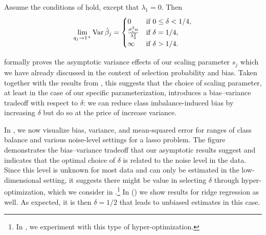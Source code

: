 \begin{corollary}
  \label{cor:ridge-variance}
  Assume the conditions of  hold, except that \(\lambda_1 = 0\). Then
  \[
    \lim_{q_j \rightarrow 1^+} \operatorname{Var} \hat{\beta}_j =
    \begin{cases}
      0                                          & \text{if } 0 \leq \delta < 1/4, \\
      \frac{\sigma_\varepsilon^2 n}{\lambda_2^2} & \text{if } \delta = 1/4,        \\
      \infty                                     & \text{if } \delta > 1/4.
    \end{cases}
  \]
\end{corollary}

 formally proves the asymptotic variance effects of our
scaling parameter \(s_j\) which we have already discussed in the context of selection
probability and bias. Taken together with the results from ,
this suggests that the choice of scaling parameter, at least in the case of our specific
parameterization, introduces a bias--variance tradeoff with respect to \(\delta\): we can
reduce class imbalance-induced bias by increasing \(\delta\) but do so at the price of
increase variance.

In , we now visualize bias, variance, and mean-squared
error for ranges of class balance and various noise-level settings for a lasso problem. The
figure demonstrates the bias--variance tradeoff that our asymptotic results suggest and
indicates that the optimal choice of \(\delta\) is related to the noise level in the data.
Since this level is unknown for most data and can only be estimated in the low-dimensional
setting, it suggests there might be value in selecting \(\delta\) through
hyper-optimization, which we consider in .\footnote{In
  , we experiment with this type of hyper-optimization.}
In  () we show
results for ridge regression as well. As expected, it is then \(\delta = 1/2\) that leads
to unbiased estimates in this case.


